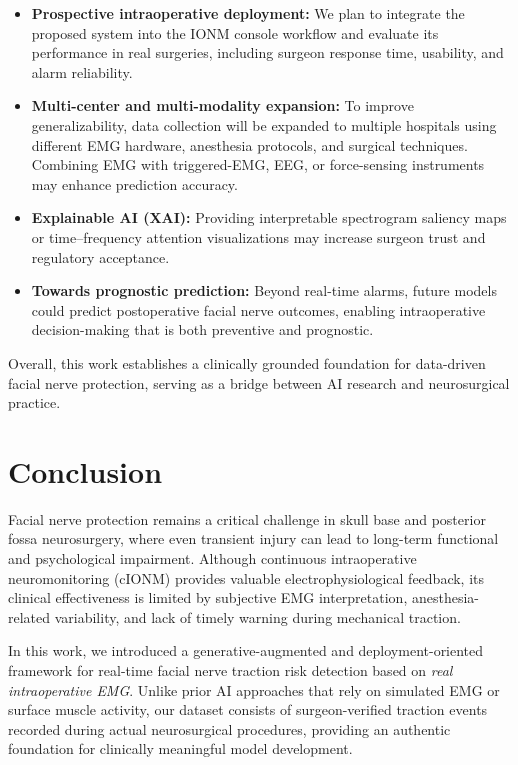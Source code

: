 \documentclass[10pt]{article}
\begin{document}
\begin{itemize}
    \item \textbf{Prospective intraoperative deployment:} We plan to integrate the proposed system into the IONM console workflow and evaluate its performance in real surgeries, including surgeon response time, usability, and alarm reliability.
    \item \textbf{Multi-center and multi-modality expansion:} To improve generalizability, data collection will be expanded to multiple hospitals using different EMG hardware, anesthesia protocols, and surgical techniques. Combining EMG with triggered-EMG, EEG, or force-sensing instruments may enhance prediction accuracy.
    \item \textbf{Explainable AI (XAI):} Providing interpretable spectrogram saliency maps or time–frequency attention visualizations may increase surgeon trust and regulatory acceptance.
    \item \textbf{Towards prognostic prediction:} Beyond real-time alarms, future models could predict postoperative facial nerve outcomes, enabling intraoperative decision-making that is both preventive and prognostic.
\end{itemize}

Overall, this work establishes a clinically grounded foundation for data-driven facial nerve protection, serving as a bridge between AI research and neurosurgical practice.

\section{Conclusion}

Facial nerve protection remains a critical challenge in skull base and posterior fossa neurosurgery, where even transient injury can lead to long-term functional and psychological impairment. Although continuous intraoperative neuromonitoring (cIONM) provides valuable electrophysiological feedback, its clinical effectiveness is limited by subjective EMG interpretation, anesthesia-related variability, and lack of timely warning during mechanical traction.

In this work, we introduced a generative-augmented and deployment-oriented framework for real-time facial nerve traction risk detection based on \emph{real intraoperative EMG}. Unlike prior AI approaches that rely on simulated EMG or surface muscle activity, our dataset consists of surgeon-verified traction events recorded during actual neurosurgical procedures, providing an authentic foundation for clinically meaningful model development.
\end{document}

